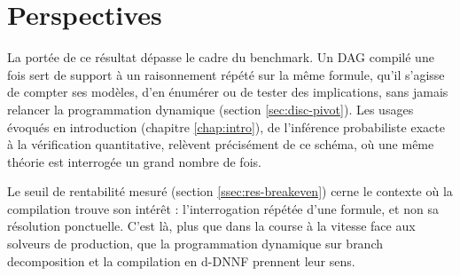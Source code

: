 \documentclass[11pt,a4paper]{report}
\theoremstyle{plain}
\theoremstyle{definition}
\begin{document}
\section{Perspectives}
\label{sec:concl-perspectives}

La portée de ce résultat dépasse le cadre du benchmark. Un DAG
compilé une fois sert de support à un raisonnement répété sur la même
formule, qu'il s'agisse de compter ses modèles, d'en énumérer ou de
tester des implications, sans jamais relancer la programmation
dynamique (section \ref{sec:disc-pivot}). Les usages évoqués en
introduction (chapitre \ref{chap:intro}), de l'inférence probabiliste
exacte à la vérification quantitative, relèvent précisément de ce
schéma, où une même théorie est interrogée un grand nombre de fois.

Le seuil de rentabilité mesuré (section \ref{ssec:res-breakeven})
cerne le contexte où la compilation trouve son intérêt :
l'interrogation répétée d'une formule, et non sa résolution
ponctuelle. C'est là, plus que dans la course à la vitesse face aux
solveurs de production, que la programmation dynamique sur branch
decomposition et la compilation en d-DNNF prennent leur sens.

\end{document}
